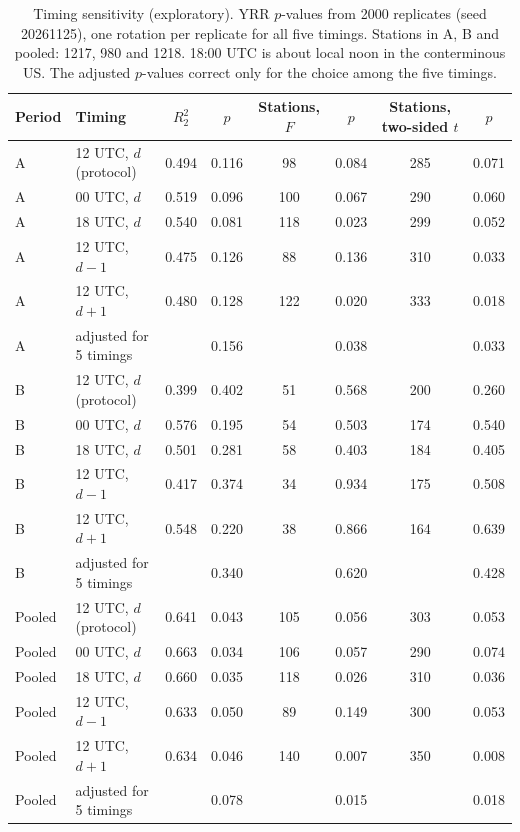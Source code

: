 \documentclass[11pt]{article}
\newcommand{\Rtwo}{R^2_2}
\begin{document}
\begin{table}[h]
\centering
\small
\begin{tabular}{llcccccc}
\toprule
Period & Timing & $\Rtwo$ & $p$ & Stations, $F$ & $p$ & Stations, two-sided $t$ & $p$\\
\midrule
A & 12 UTC, $d$ (protocol) & 0.494 & 0.116 & 98 & 0.084 & 285 & 0.071 \\
A & 00 UTC, $d$ & 0.519 & 0.096 & 100 & 0.067 & 290 & 0.060 \\
A & 18 UTC, $d$ & 0.540 & 0.081 & 118 & 0.023 & 299 & 0.052 \\
A & 12 UTC, $d-1$ & 0.475 & 0.126 & 88 & 0.136 & 310 & 0.033 \\
A & 12 UTC, $d+1$ & 0.480 & 0.128 & 122 & 0.020 & 333 & 0.018 \\
A & adjusted for 5 timings & & 0.156 & & 0.038 & & 0.033 \\ \midrule
B & 12 UTC, $d$ (protocol) & 0.399 & 0.402 & 51 & 0.568 & 200 & 0.260 \\
B & 00 UTC, $d$ & 0.576 & 0.195 & 54 & 0.503 & 174 & 0.540 \\
B & 18 UTC, $d$ & 0.501 & 0.281 & 58 & 0.403 & 184 & 0.405 \\
B & 12 UTC, $d-1$ & 0.417 & 0.374 & 34 & 0.934 & 175 & 0.508 \\
B & 12 UTC, $d+1$ & 0.548 & 0.220 & 38 & 0.866 & 164 & 0.639 \\
B & adjusted for 5 timings & & 0.340 & & 0.620 & & 0.428 \\ \midrule
Pooled & 12 UTC, $d$ (protocol) & 0.641 & 0.043 & 105 & 0.056 & 303 & 0.053 \\
Pooled & 00 UTC, $d$ & 0.663 & 0.034 & 106 & 0.057 & 290 & 0.074 \\
Pooled & 18 UTC, $d$ & 0.660 & 0.035 & 118 & 0.026 & 310 & 0.036 \\
Pooled & 12 UTC, $d-1$ & 0.633 & 0.050 & 89 & 0.149 & 300 & 0.053 \\
Pooled & 12 UTC, $d+1$ & 0.634 & 0.046 & 140 & 0.007 & 350 & 0.008 \\
Pooled & adjusted for 5 timings & & 0.078 & & 0.015 & & 0.018 \\
\bottomrule
\end{tabular}
\caption{Timing sensitivity (exploratory). YRR $p$-values from 2000 replicates (seed 20261125), one rotation per replicate for all five timings. Stations in A, B and pooled: 1217, 980 and 1218. 18:00 UTC is about local noon in the conterminous US. The adjusted $p$-values correct only for the choice among the five timings.}
\label{tab:timing}
\end{table}
\end{document}
